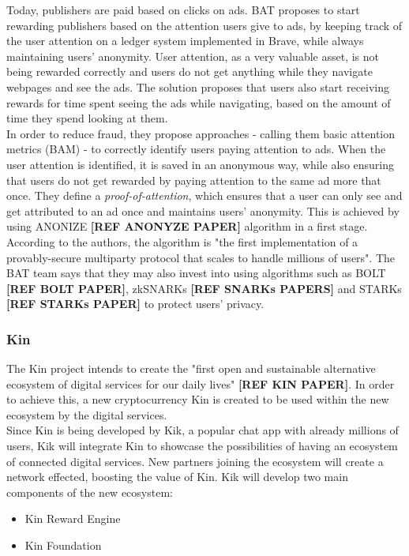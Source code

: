 Today, publishers are paid based on clicks on ads. BAT proposes to start rewarding publishers based on the attention users give to ads, by keeping track of the user attention on a ledger system implemented in Brave, while always maintaining users' anonymity. User attention, as a very valuable asset, is not being rewarded correctly and users do not get anything while they navigate webpages and see the ads. The solution proposes that users also start receiving rewards for time spent seeing the ads while navigating, based on the amount of time they spend looking at them. \\

In order to reduce fraud, they propose approaches - calling them basic attention metrics (BAM) - to correctly identify users paying attention to ads. When the user attention is identified, it is saved in an anonymous way, while also ensuring that users do not get rewarded by paying attention to the same ad more that once. They define a \textit{proof-of-attention}, which ensures that a user can only see and get attributed to an ad once and maintains users' anonymity. This is achieved by using \textsf{ANONIZE} \textbf{[REF ANONYZE PAPER]} algorithm in a first stage. According to the authors, the algorithm is "the first implementation of a provably-secure multiparty protocol that scales to handle millions of users".  The BAT team says that they may also invest into using algorithms such as BOLT \textbf{[REF BOLT PAPER]}, zkSNARKs \textbf{[REF SNARKs PAPERS]} and STARKs \textbf{[REF STARKs PAPER]} to protect users' privacy.

\subsubsection{Kin}

The Kin project intends to create the "first open and sustainable alternative ecosystem of digital services
for our daily lives" \textbf{[REF KIN PAPER]}. In order to achieve this, a new cryptocurrency Kin is created to be used within the new ecosystem by the digital services. \\

Since Kin is being developed by Kik, a popular chat app with already millions of users, Kik will integrate Kin to showcase the possibilities of having an ecosystem of connected digital services. New partners joining the ecosystem will create a network effected, boosting the value of Kin. Kik will develop two main components of the new ecosystem:
\begin{itemize}
	\item Kin Reward Engine
	\item Kin Foundation
\end{itemize}

